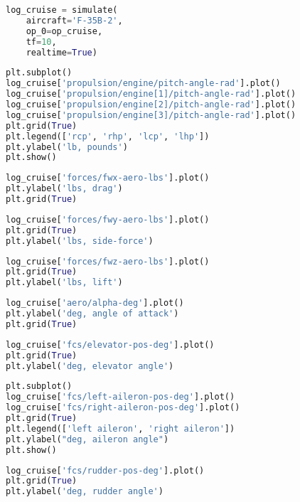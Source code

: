 \begin{lstlisting}[language=Python]
log_cruise = simulate(
    aircraft='F-35B-2',
    op_0=op_cruise,
    tf=10,
    realtime=True)
\end{lstlisting}

\begin{lstlisting}[language=Python]
plt.subplot()
log_cruise['propulsion/engine/pitch-angle-rad'].plot()
log_cruise['propulsion/engine[1]/pitch-angle-rad'].plot()
log_cruise['propulsion/engine[2]/pitch-angle-rad'].plot()
log_cruise['propulsion/engine[3]/pitch-angle-rad'].plot()
plt.grid(True)
plt.legend(['rcp', 'rhp', 'lcp', 'lhp'])
plt.ylabel('lb, pounds')
plt.show()
\end{lstlisting}

\begin{lstlisting}[language=Python]
log_cruise['forces/fwx-aero-lbs'].plot()
plt.ylabel('lbs, drag')
plt.grid(True)
\end{lstlisting}

\begin{lstlisting}[language=Python]
log_cruise['forces/fwy-aero-lbs'].plot()
plt.grid(True)
plt.ylabel('lbs, side-force')
\end{lstlisting}

\begin{lstlisting}[language=Python]
log_cruise['forces/fwz-aero-lbs'].plot()
plt.grid(True)
plt.ylabel('lbs, lift')
\end{lstlisting}

\begin{lstlisting}[language=Python]
log_cruise['aero/alpha-deg'].plot()
plt.ylabel('deg, angle of attack')
plt.grid(True)
\end{lstlisting}

\begin{lstlisting}[language=Python]
log_cruise['fcs/elevator-pos-deg'].plot()
plt.grid(True)
plt.ylabel('deg, elevator angle')
\end{lstlisting}

\begin{lstlisting}[language=Python]
plt.subplot()
log_cruise['fcs/left-aileron-pos-deg'].plot()
log_cruise['fcs/right-aileron-pos-deg'].plot()
plt.grid(True)
plt.legend(['left aileron', 'right aileron'])
plt.ylabel("deg, aileron angle")
plt.show()
\end{lstlisting}

\begin{lstlisting}[language=Python]
log_cruise['fcs/rudder-pos-deg'].plot()
plt.grid(True)
plt.ylabel('deg, rudder angle')
\end{lstlisting}

